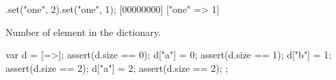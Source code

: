 \begin{urbiscriptapi}
\begin{urbiscript}
[=>].set("one", 2).set("one", 1);
[00000000] ["one" => 1]
\end{urbiscript}


\item[size]
  Number of element in the dictionary.

\begin{urbiscript}
{
  var d = [=>];
  assert(d.size == 0);
  d["a"] = 0;
  assert(d.size == 1);
  d["b"] = 1;
  assert(d.size == 2);
  d["a"] = 2;
  assert(d.size == 2);
};
\end{urbiscript}



\end{urbiscriptapi}


